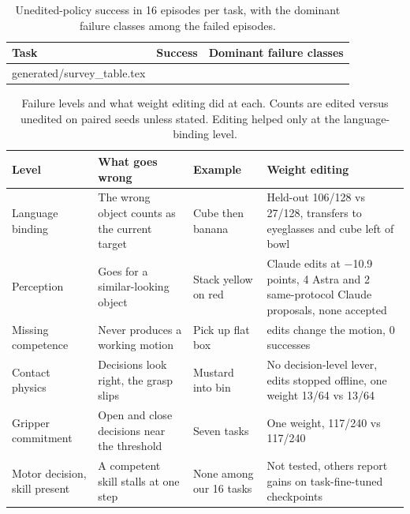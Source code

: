 \documentclass{article}
\makeatletter
\newcommand{\tabinput}[1]{\@@input #1 }
\makeatother
\begin{document}
\begin{table}[htbp]
\centering\small
\caption{Unedited-policy success in 16 episodes per task, with the dominant failure classes among the failed episodes.}
\label{tab:survey}
\begin{tabular}{@{}p{.36\linewidth}rp{.44\linewidth}@{}}
\toprule
Task & Success & Dominant failure classes\\
\midrule
\tabinput{generated/survey_table.tex}
\bottomrule
\end{tabular}
\end{table}

\begin{table}[htbp]
\centering\small
\caption{Failure levels and what weight editing did at each. Counts are edited versus unedited on paired seeds unless stated. Editing helped only at the language-binding level.}
\label{tab:levels}
\begin{tabular}{@{}>{\raggedright\arraybackslash}p{.16\linewidth}>{\raggedright\arraybackslash}p{.26\linewidth}>{\raggedright\arraybackslash}p{.15\linewidth}>{\raggedright\arraybackslash}p{.32\linewidth}@{}}
\toprule
Level & What goes wrong & Example & Weight editing\\
\midrule
Language binding & The wrong object counts as the current target & Cube then banana & Held-out 106/128 vs 27/128, transfers to eyeglasses and cube left of bowl\\
Perception & Goes for a similar-looking object & Stack yellow on red & 3 Claude edits at $-$10.9 points, 4 Astra and 2 same-protocol Claude proposals, none accepted\\
Missing competence & Never produces a working motion & Pick up flat box & 10 edits change the motion, 0 successes\\
Contact physics & Decisions look right, the grasp slips & Mustard into bin & No decision-level lever, edits stopped offline, one weight 13/64 vs 13/64\\
Gripper commitment & Open and close decisions near the threshold & Seven tasks & One weight, 117/240 vs 117/240\\
Motor decision, skill present & A competent skill stalls at one step & None among our 16 tasks & Not tested, others report gains on task-fine-tuned checkpoints\\
\bottomrule
\end{tabular}
\end{table}

\FloatBarrier
\end{document}
